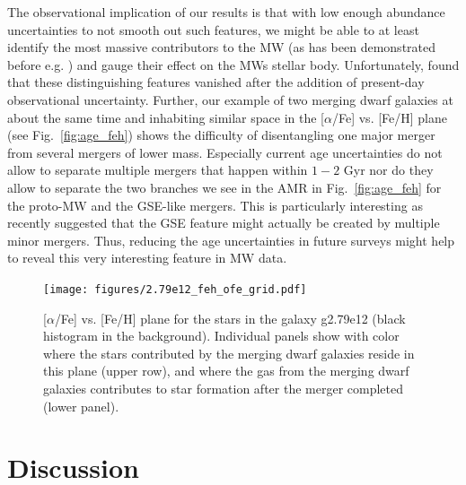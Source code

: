 \documentclass[useAMS,usenatbib]{mnras}
\begin{document}
The observational implication of our results is that with low enough abundance uncertainties to not smooth out such features, we might be able to at least identify the most massive contributors to the MW (as has been demonstrated before e.g. \citealt{Vincenzo2019, Belokurov2020, Naidu2021, Xiang2022}) and gauge their effect on the MWs stellar body. Unfortunately, \cite{Ratcliffe2022} found that these distinguishing features vanished after the addition of present-day observational uncertainty. Further, our example of two merging dwarf galaxies at about the same time and inhabiting similar space in the [$\alpha$/Fe] vs. [Fe/H] plane (see Fig.~\ref{fig:age_feh}) shows the difficulty of disentangling one major merger from several mergers of lower mass. Especially current age uncertainties do not allow to separate multiple mergers that happen within $1-2$ Gyr nor do they allow to separate the two branches we see in the AMR in Fig.~\ref{fig:age_feh} for the proto-MW and the GSE-like mergers. This is particularly interesting as \cite{Donlon2022} recently suggested that the GSE feature might actually be created by multiple minor mergers. Thus, reducing the age uncertainties in future surveys might help to reveal this very interesting feature in MW data.


\begin{figure}
    \begin{centering}
        \texttt{[image: figures/2.79e12\_feh\_ofe\_grid.pdf]}
        \vspace*{-1.75em}
        \caption{
            [$\alpha$/Fe] vs. [Fe/H] plane for the stars in the galaxy g2.79e12 (black histogram in the background). Individual panels show with color where the stars contributed by the merging dwarf galaxies reside in this plane (upper row), and where the gas from the merging dwarf galaxies contributes to star formation after the merger completed (lower panel). 
        }
        \label{fig:ofe_feh}
    \end{centering}
\end{figure}


\section{Discussion}
\label{sec:discussion}
\end{document}
